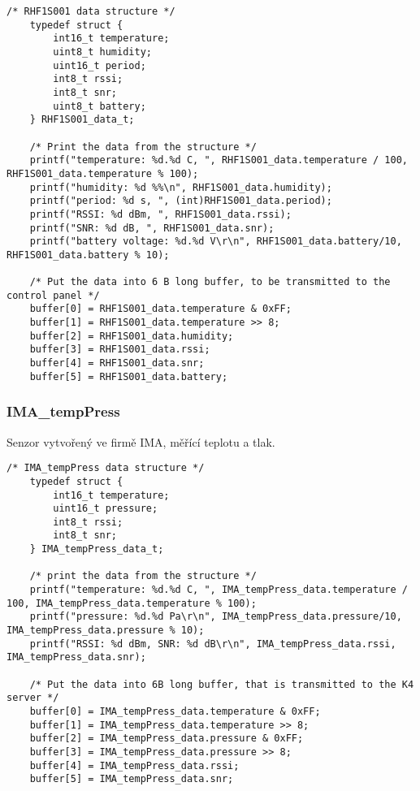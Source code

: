 \begin{lstlisting}[style=CStyle]
    /* RHF1S001 data structure */   
    typedef struct {
        int16_t temperature;
        uint8_t humidity;
        uint16_t period;
        int8_t rssi;
        int8_t snr;
        uint8_t battery;
    } RHF1S001_data_t;

    /* Print the data from the structure */
    printf("temperature: %d.%d C, ", RHF1S001_data.temperature / 100, RHF1S001_data.temperature % 100);
    printf("humidity: %d %%\n", RHF1S001_data.humidity);
    printf("period: %d s, ", (int)RHF1S001_data.period);
    printf("RSSI: %d dBm, ", RHF1S001_data.rssi);
    printf("SNR: %d dB, ", RHF1S001_data.snr);
    printf("battery voltage: %d.%d V\r\n", RHF1S001_data.battery/10, RHF1S001_data.battery % 10);

    /* Put the data into 6 B long buffer, to be transmitted to the control panel */
    buffer[0] = RHF1S001_data.temperature & 0xFF;
    buffer[1] = RHF1S001_data.temperature >> 8;
    buffer[2] = RHF1S001_data.humidity;
    buffer[3] = RHF1S001_data.rssi;
    buffer[4] = RHF1S001_data.snr;
    buffer[5] = RHF1S001_data.battery;
\end{lstlisting}


\subsubsection{IMA\_tempPress}
Senzor vytvořený ve firmě IMA, měřící teplotu a tlak.

\begin{lstlisting}[style=CStyle]
    /* IMA_tempPress data structure */   
    typedef struct {
        int16_t temperature;
        uint16_t pressure;
        int8_t rssi;
        int8_t snr;
    } IMA_tempPress_data_t;
    
    /* print the data from the structure */
    printf("temperature: %d.%d C, ", IMA_tempPress_data.temperature / 100, IMA_tempPress_data.temperature % 100);
    printf("pressure: %d.%d Pa\r\n", IMA_tempPress_data.pressure/10, IMA_tempPress_data.pressure % 10);
    printf("RSSI: %d dBm, SNR: %d dB\r\n", IMA_tempPress_data.rssi, IMA_tempPress_data.snr);

    /* Put the data into 6B long buffer, that is transmitted to the K4 server */
    buffer[0] = IMA_tempPress_data.temperature & 0xFF;
    buffer[1] = IMA_tempPress_data.temperature >> 8;
    buffer[2] = IMA_tempPress_data.pressure & 0xFF;
    buffer[3] = IMA_tempPress_data.pressure >> 8;
    buffer[4] = IMA_tempPress_data.rssi;
    buffer[5] = IMA_tempPress_data.snr;
\end{lstlisting}


